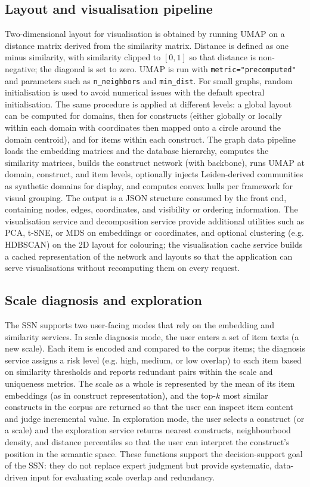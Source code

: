 \documentclass[11pt]{article}
\begin{document}
\subsection{Layout and visualisation pipeline}

Two-dimensional layout for visualisation is obtained by running UMAP on a distance matrix derived from the similarity matrix. Distance is defined as one minus similarity, with similarity clipped to $[0,1]$ so that distance is non-negative; the diagonal is set to zero. UMAP is run with \texttt{metric="precomputed"} and parameters such as \texttt{n\_neighbors} and \texttt{min\_dist}. For small graphs, random initialisation is used to avoid numerical issues with the default spectral initialisation. The same procedure is applied at different levels: a global layout can be computed for domains, then for constructs (either globally or locally within each domain with coordinates then mapped onto a circle around the domain centroid), and for items within each construct. The graph data pipeline loads the embedding matrices and the database hierarchy, computes the similarity matrices, builds the construct network (with backbone), runs UMAP at domain, construct, and item levels, optionally injects Leiden-derived communities as synthetic domains for display, and computes convex hulls per framework for visual grouping. The output is a JSON structure consumed by the front end, containing nodes, edges, coordinates, and visibility or ordering information. The visualisation service and decomposition service provide additional utilities such as PCA, t-SNE, or MDS on embeddings or coordinates, and optional clustering (e.g. HDBSCAN) on the 2D layout for colouring; the visualisation cache service builds a cached representation of the network and layouts so that the application can serve visualisations without recomputing them on every request.

\subsection{Scale diagnosis and exploration}

The SSN supports two user-facing modes that rely on the embedding and similarity services. In scale diagnosis mode, the user enters a set of item texts (a new scale). Each item is encoded and compared to the corpus items; the diagnosis service assigns a risk level (e.g. high, medium, or low overlap) to each item based on similarity thresholds and reports redundant pairs within the scale and uniqueness metrics. The scale as a whole is represented by the mean of its item embeddings (as in construct representation), and the top-$k$ most similar constructs in the corpus are returned so that the user can inspect item content and judge incremental value. In exploration mode, the user selects a construct (or a scale) and the exploration service returns nearest constructs, neighbourhood density, and distance percentiles so that the user can interpret the construct's position in the semantic space. These functions support the decision-support goal of the SSN: they do not replace expert judgment but provide systematic, data-driven input for evaluating scale overlap and redundancy.
\end{document}
